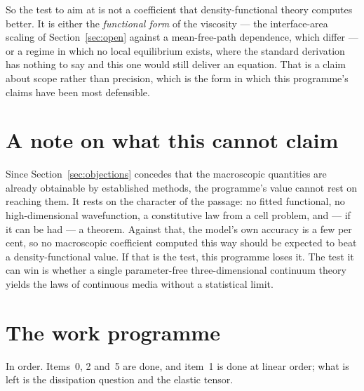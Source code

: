 \documentclass[11pt]{article}
\begin{document}
So the test to aim at is not a coefficient that density-functional theory computes better. It is
either the \emph{functional form} of the viscosity --- the interface-area scaling of
Section~\ref{sec:open} against a mean-free-path dependence, which differ --- or a regime in which no
local equilibrium exists, where the standard derivation has nothing to say and this one would still
deliver an equation. That is a claim about scope rather than precision, which is the form in which
this programme's claims have been most defensible.

\section{A note on what this cannot claim}\label{sec:price-note}

Since Section~\ref{sec:objections} concedes that the macroscopic quantities are already obtainable
by established methods, the programme's value cannot rest on reaching them. It rests on the
character of the passage: no fitted functional, no high-dimensional wavefunction, a constitutive law
from a cell problem, and --- if it can be had --- a theorem. Against that, the model's own accuracy
is a few per cent, so no macroscopic coefficient computed this way should be expected to beat a
density-functional value. If that is the test, this programme loses it. The test it can win is
whether a single parameter-free three-dimensional continuum theory yields the laws of continuous
media without a statistical limit.

\section{The work programme}\label{sec:programme}

In order. Items~0, 2 and~5 are done, and item~1 is done at linear order; what is left is the
dissipation question and the elastic tensor.
\end{document}

